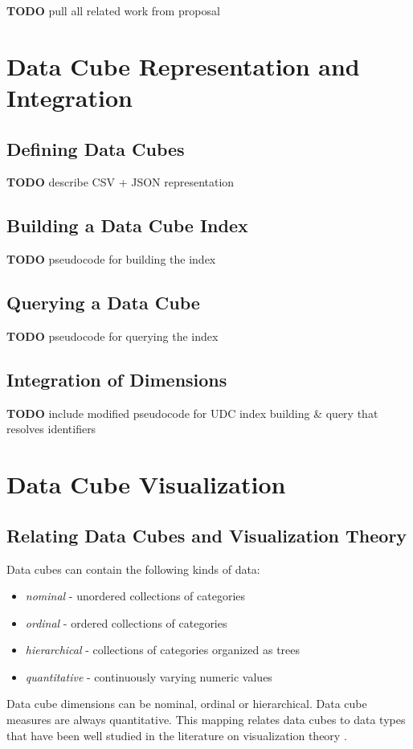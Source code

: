 \documentclass[12pt]{report}
\newcommand{\TODO}[1]{{ \color{red}\textbf{TODO} #1 }}
\begin{document}
\begin{doublespace}
%
\TODO{pull all related work from proposal}

\pagebreak
\section{Data Cube Representation and Integration}
\subsection{Defining Data Cubes}
\TODO{describe CSV + JSON representation}
\subsection{Building a Data Cube Index}
\TODO{ pseudocode for building the index}
\subsection{Querying a Data Cube}
\TODO{ pseudocode for querying the index}
\subsection{Integration of Dimensions}
\TODO{ include modified pseudocode for UDC index building \& query that resolves identifiers}

\pagebreak
\section{Data Cube Visualization} \label{dataCubeVisualization}
\subsection{Relating Data Cubes and Visualization Theory}
Data cubes can contain the following kinds of data:
\begin{itemize}
\item \emph{nominal} - unordered collections of categories
\item \emph{ordinal} - ordered collections of categories
\item \emph{hierarchical} - collections of categories organized as trees
\item \emph{quantitative} - continuously varying numeric values
\end{itemize}
Data cube dimensions can be nominal, ordinal or hierarchical. Data cube measures are always quantitative. This mapping relates data cubes to data types that have been well studied in the literature on visualization theory \cite{bertin1983semiology, mackinlay1986automating, graham2010survey}.



\end{doublespace}
\end{document}
